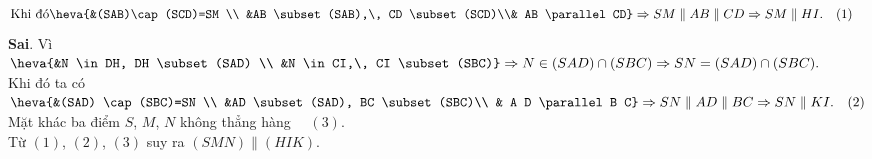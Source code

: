 \begin{ex}
{\begin{itemchoice}
$$\begin{aligned}
   &\text{Khi đó}\heva{&(SAB)\cap(SCD)=SM  \\
   &AB  \subset(SAB),\, CD \subset(SCD)\\& AB \parallel CD}
   \Rightarrow SM \parallel AB  \parallel CD \Rightarrow SM \parallel HI.\quad(1)
  \end{aligned}
   $$
  \itemch  \textbf{Sai}.
  Vì $\heva{&N \in DH,  DH \subset(SAD) \\
  &N  \in CI,\, CI \subset(SBC)}\Rightarrow N \in(SAD) \cap(SBC) \\
  \Rightarrow  SN=(SAD)\cap(SBC) .$\\
  Khi đó ta có  $
  \heva{&(SAD) \cap(SBC)=SN \\ 
  &AD \subset(SAD),  BC \subset(SBC)\\
  &  A D \parallel B C}
   \Rightarrow SN \parallel AD \parallel BC \Rightarrow SN \parallel KI.\quad(2)$
   Mặt khác ba điểm $S$, $M$, $N$ không thẳng hàng $\quad(3)$.\\
  Từ $(1)$, $(2)$,  $(3)$ suy ra $(SMN) \parallel(HIK)$.
 \end{itemchoice}
 }
\end{ex}

